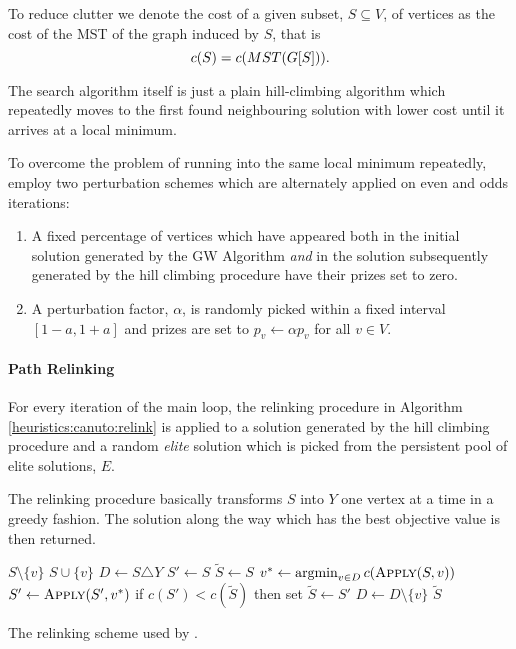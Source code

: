 To reduce clutter we denote the cost
of a given subset, $S \subseteq V$, of vertices as the cost
of the MST of the graph induced by $S$, that is
\[c(S) = c(MST(G[S]))\mathnormal{.}\]

The search algorithm itself is just a plain hill-climbing algorithm which repeatedly
 moves to the first
 found neighbouring solution with lower cost until it arrives at a local minimum.

 To overcome the problem of running into the same local minimum repeatedly,
 \citet{canuto2001local} employ two perturbation schemes which are alternately applied
 on even and odds iterations:
 \begin{enumerate}
 \item A fixed percentage of vertices which have appeared both in the initial solution generated
   by the GW Algorithm \textit{and}  in the solution subsequently generated by
    the hill climbing procedure have their prizes
    set to zero.
  \item A perturbation factor, $\alpha$, is randomly picked within a fixed interval $[1 -a, 1+a]$
    and prizes are set to $p_v \gets \alpha p_v$ for all $v \in V$.
 \end{enumerate}

\paragraph{Path Relinking}
For every iteration of the main loop, the relinking procedure in Algorithm \ref{heuristics:canuto:relink}
is applied to a solution generated by the hill climbing procedure and 
a random \textit{elite} solution which is picked from the
persistent pool of elite solutions, $E$.

The relinking procedure basically transforms $S$ into $Y$ one vertex at a time in a greedy fashion.
The solution along the way which has the best objective value is then returned.
 \begin{algorithm}[h!]
   \begin{algorithmic}[1]
     \State \Return $S \setminus \{v\}$
     \Else
     \State \Return $S \cup \{v\}$
     \EndIf
     \EndProcedure
     \State $D \gets S \triangle Y$
     \State $S' \gets S$
     \State $\tilde{S} \gets S$
     \State $v^* \gets \argmin_{v \in D} c(\Call{Apply}{S,v})$
     \State $S' \gets \Call{Apply}{S', v^*}$
     \State if $c(S') < c(\tilde{S})$ then set $\tilde{S} \gets S'$
     \State $D \gets D \setminus \{v\}$
     \EndWhile
     \State \Return $\tilde{S}$
     \EndProcedure
 \end{algorithmic}
 \caption{The relinking scheme used by \citet{canuto2001local}.}\label{heuristics:canuto:relink}
 \end{algorithm}

